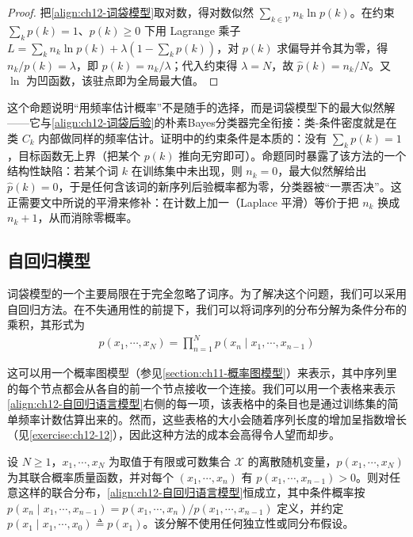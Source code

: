 \documentclass[../../main.tex]{subfiles}
\begin{document}
\begin{proof}
把\eqref{align:ch12-词袋模型}取对数，得对数似然 $\sum_{k\in\mathcal{V}}n_k\ln p(k)$。在约束 $\sum_{k}p(k)=1$、$p(k)\geqslant0$ 下用 Lagrange 乘子 $L=\sum_k n_k\ln p(k)+\lambda\left(1-\sum_k p(k)\right)$，对 $p(k)$ 求偏导并令其为零，得 $n_k/p(k)=\lambda$，即 $p(k)=n_k/\lambda$；代入约束得 $\lambda=N$，故 $\hat{p}(k)=n_k/N$。又 $\ln$ 为凹函数，该驻点即为全局最大值。
\end{proof}

\begin{remark}
这个命题说明“用频率估计概率”不是随手的选择，而是词袋模型下的最大似然解——它与\eqref{align:ch12-词袋后验}的朴素Bayes分类器完全衔接：类-条件密度就是在类 $C_k$ 内部做同样的频率估计。证明中的约束条件是本质的：没有 $\sum_k p(k)=1$，目标函数无上界（把某个 $p(k)$ 推向无穷即可）。命题同时暴露了该方法的一个结构性缺陷：若某个词 $k$ 在训练集中未出现，则 $n_k=0$，最大似然解给出 $\hat{p}(k)=0$，于是任何含该词的新序列后验概率都为零，分类器被“一票否决”。这正需要文中所说的平滑来修补：在计数上加一（Laplace 平滑）等价于把 $n_k$ 换成 $n_k+1$，从而消除零概率。
\end{remark}

\subsection{自回归模型}\label{subsection:ch12-自回归模型}

词袋模型的一个主要局限在于完全忽略了词序。为了解决这个问题，我们可以采用自回归方法。在不失通用性的前提下，我们可以将词序列的分布分解为条件分布的乘积，其形式为
\begin{align}
p(x_1,\cdots,x_N)=\prod_{n=1}^{N}p(x_n\mid x_1,\cdots,x_{n-1})
\label{align:ch12-自回归语言模型}
\end{align}

这可以用一个概率图模型（参见\cref{section:ch11-概率图模型}）来表示，其中序列里的每个节点都会从各自的前一个节点接收一个连接。我们可以用一个表格来表示\eqref{align:ch12-自回归语言模型}右侧的每一项，该表格中的条目也是通过训练集的简单频率计数估算出来的。然而，这些表格的大小会随着序列长度的增加呈指数增长（见\cref{exercise:ch12-12}），因此这种方法的成本会高得令人望而却步。

\begin{proposition}[自回归分解]\label{proposition:ch12-自回归分解}
设 $N\geqslant1$，$x_1,\cdots,x_N$ 为取值于有限或可数集合 $\mathcal{X}$ 的离散随机变量，$p(x_1,\cdots,x_N)$ 为其联合概率质量函数，并对每个 $(x_1,\cdots,x_n)$ 有 $p(x_1,\cdots,x_{n-1})>0$。则对任意这样的联合分布，\eqref{align:ch12-自回归语言模型}恒成立，其中条件概率按 $p(x_n\mid x_1,\cdots,x_{n-1})=p(x_1,\cdots,x_n)/p(x_1,\cdots,x_{n-1})$ 定义，并约定 $p(x_1\mid x_1,\cdots,x_0)\triangleq p(x_1)$。该分解不使用任何独立性或同分布假设。
\end{proposition}
\end{document}
